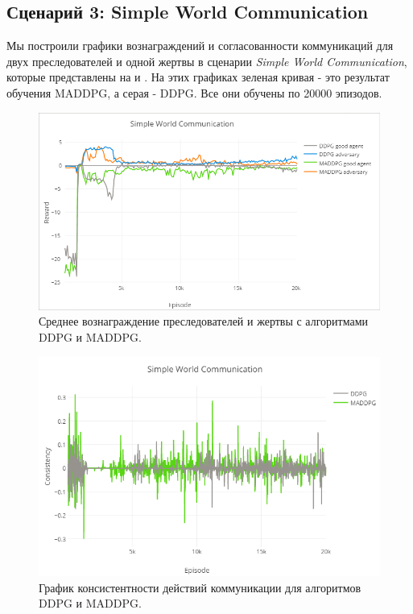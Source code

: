 \subsection{Сценарий 3: Simple World Communication}

Мы построили графики вознаграждений и согласованности коммуникаций для двух преследователей и одной жертвы в сценарии \textit{Simple World Communication}, которые представлены на  и . На этих графиках зеленая кривая - это результат обучения MADDPG, а серая - DDPG. Все они обучены по 20000 эпизодов.

\begin{figure}[ht!]
	\center
	\includegraphics [scale=0.6] {my_folder/images/ch5/swc-rew.png}
	\caption{Среднее вознаграждение преследователей и жертвы с алгоритмами DDPG и MADDPG.}
	\label{fig:result-swc-rew}
\end{figure}

\begin{figure}[ht!]
	\center
	\includegraphics [scale=0.6] {my_folder/images/ch5/swc-comm.png}
	\caption{График консистентности действий коммуникации для алгоритмов DDPG и MADDPG.}
	\label{fig:result-swc-comm}
\end{figure}

